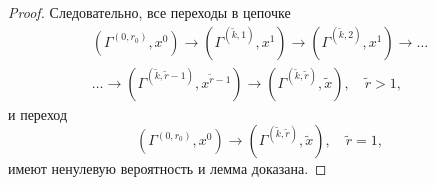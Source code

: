\begin{proof}
Следовательно,  все переходы в цепочке
\begin{multline*}
(\Gamma^{(0, r_0)}, x^0) \rightarrow (\Gamma^{(\tilde{k}, 1)}, x^1) \rightarrow (\Gamma^{(\tilde{k}, 2)}, x^1) \rightarrow \ldots \\ 
\ldots \rightarrow
(\Gamma^{(\tilde{k}, \tilde{r}-1)}, x^{\tilde{r} - 1})  \rightarrow  (\Gamma^{(\tilde{k},  \tilde{r})},  \tilde{x}),  \quad \tilde{r} > 1, 
\end{multline*}
и переход
\begin{equation*}
(\Gamma^{(0, r_0)}, x^0) \rightarrow (\Gamma^{(\tilde{k},  \tilde{r})},  \tilde{x}),  \quad \tilde{r} = 1, 
\end{equation*}
имеют ненулевую вероятность и лемма доказана. 

\end{proof}

